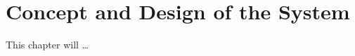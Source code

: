 
\chapter{Concept and Design of the System} %
\label{cha:design_system}

This chapter will \ldots







